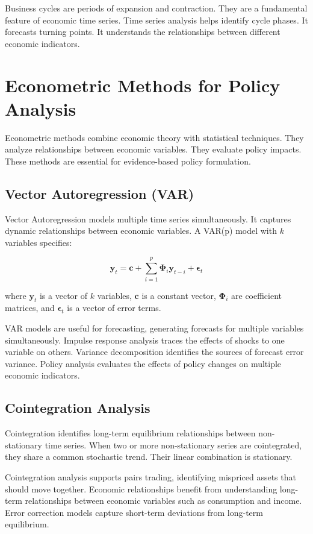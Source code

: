 Business cycles are periods of expansion and contraction. They are a fundamental feature of economic time series. Time series analysis helps identify cycle phases. It forecasts turning points. It understands the relationships between different economic indicators.

\section{Econometric Methods for Policy Analysis}

Econometric methods combine economic theory with statistical techniques. They analyze relationships between economic variables. They evaluate policy impacts. These methods are essential for evidence-based policy formulation.

\subsection{Vector Autoregression (VAR)}

Vector Autoregression models multiple time series simultaneously. It captures dynamic relationships between economic variables. A VAR(p) model with \(k\) variables specifies:

\[
\mathbf{y}_t = \mathbf{c} + \sum_{i=1}^{p} \mathbf{\Phi}_i \mathbf{y}_{t-i} + \boldsymbol{\epsilon}_t
\]

where \(\mathbf{y}_t\) is a vector of \(k\) variables, \(\mathbf{c}\) is a constant vector, \(\mathbf{\Phi}_i\) are coefficient matrices, and \(\boldsymbol{\epsilon}_t\) is a vector of error terms.

VAR models are useful for forecasting, generating forecasts for multiple variables simultaneously. Impulse response analysis traces the effects of shocks to one variable on others. Variance decomposition identifies the sources of forecast error variance. Policy analysis evaluates the effects of policy changes on multiple economic indicators.

\subsection{Cointegration Analysis}

Cointegration identifies long-term equilibrium relationships between non-stationary time series. When two or more non-stationary series are cointegrated, they share a common stochastic trend. Their linear combination is stationary.

Cointegration analysis supports pairs trading, identifying mispriced assets that should move together. Economic relationships benefit from understanding long-term relationships between economic variables such as consumption and income. Error correction models capture short-term deviations from long-term equilibrium.

